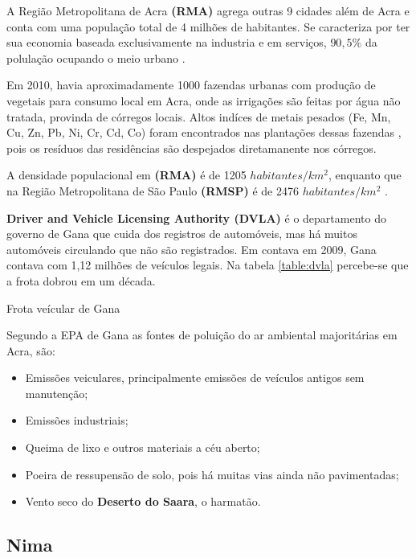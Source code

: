 A Região Metropolitana de Acra \textbf{(RMA)} agrega outras 9 cidades
além de Acra e conta com uma população total de 4 milhões de habitantes. 
Se caracteriza por ter sua economia baseada exclusivamente na industria 
e em serviços, $90,5\%$ da polulação ocupando o meio urbano \citep{ghanacensus2013}.

Em 2010, havia aproximadamente 1000 fazendas urbanas com produção de vegetais 
para consumo local em Acra, onde as irrigações são feitas por água não tratada, 
provinda de córregos locais. Altos indíces de metais pesados 
(Fe, Mn, Cu, Zn, Pb, Ni, Cr, Cd, Co) foram encontrados nas plantações 
dessas fazendas \citep{lente2014}, pois os resíduos das residências são despejados 
diretamanente nos córregos.

A densidade populacional em \textbf{(RMA)} é de 1205 $habitantes/km^2$, 
enquanto que na Região Metropolitana de São Paulo \textbf{(RMSP)} é de 
2476 $habitantes/km^2$ \citep{ibge2011}. 

\textbf{Driver and Vehicle Licensing Authority (DVLA)} é o
departamento do governo de Gana que cuida dos registros de automóveis, 
mas há muitos automóveis circulando que não são registrados. 
Em contava em 2009, Gana contava com 1,12 milhões de veículos legais. 
Na tabela \ref{table:dvla} percebe-se que a frota dobrou em um década.

\begin{table}[H]
 \centering
  
  \caption{Frota veícular de Gana \citep{dvla} \label{table:dvla}}
\end{table}

Segundo a EPA de Gana \citep{epagh} as fontes de poluição do ar ambiental 
majoritárias em Acra, são:

\begin{itemize}
  \item Emissões veiculares, principalmente emissões de veículos antigos sem manutenção;
  \item Emissões industriais;
  \item Queima de lixo e outros materiais a céu aberto;
  \item Poeira de ressupensão de solo, pois há muitas vias ainda não pavimentadas;
  \item Vento seco do \textbf{Deserto do Saara}, o harmatão.
\end{itemize}

\subsection{Nima}

